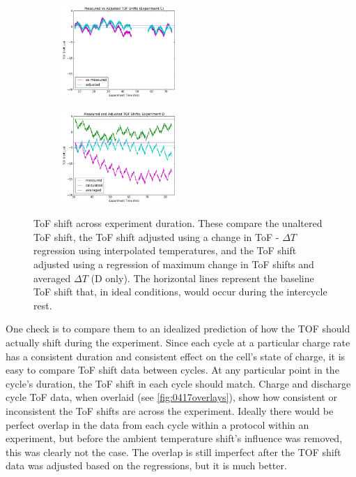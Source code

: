 \begin{figure}[t!]\label{fig:adj}
\centering
     \begin{subfigure}
         \centering
         \includegraphics[width=0.48\textwidth]{Thesis/0409adj.png}
     \end{subfigure}
     \hfill
     \begin{subfigure}
         \centering
         \includegraphics[width=0.48\textwidth]{Thesis/0417adj.png}
     \end{subfigure}
     \caption{ToF shift across experiment duration. These compare the unaltered ToF shift, the ToF shift adjusted using a change in ToF - $\Delta T$ regression using interpolated temperatures, and the ToF shift adjusted using a regression of maximum change in ToF shifts and averaged $\Delta T$ (D only). The horizontal lines represent the baseline ToF shift that, in ideal conditions, would occur during the intercycle rest.}
\end{figure}

One check is to compare them to an idealized prediction of how the TOF should actually shift during the experiment. 
Since each cycle at a particular charge rate has a consistent duration and consistent effect on the cell's state of charge, it is easy to compare ToF shift data between cycles. 
At any particular point in the cycle's duration, the ToF shift in each cycle should match. Charge and discharge cycle ToF data, when overlaid (see \hyperref[fig:0417overlays]{\cref{fig:0417overlays}}), show how consistent or inconsistent the ToF shifts are across the experiment.
Ideally there would be perfect overlap in the data from each cycle within a protocol within an experiment, but before the ambient temperature shift's influence was removed, this was clearly not the case. 
The overlap is still imperfect after the TOF shift data was adjusted based on the regressions, but it is much better.


